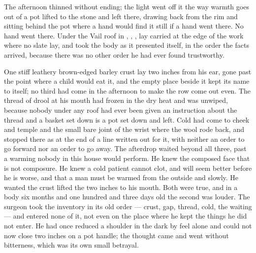 The afternoon thinned without ending; the light went off it the way warmth goes out of a pot lifted to the stone and left there, drawing back from the rim and sitting behind the pot where a hand would find it still if a hand went there. No hand went there. Under the Vail roof in , , ,  lay carried at the edge of the work where no slate lay, and took the body as it presented itself, in the order the facts arrived, because there was no other order he had ever found trustworthy.

One stiff leathery brown-edged barley crust lay two inches from his ear, gone past the point where a child would eat it, and the empty place beside it kept its name to itself; no third had come in the afternoon to make the row come out even. The thread of drool at his mouth had frozen in the dry heat and was unwiped, because nobody under any roof had ever been given an instruction about the thread and a basket set down is a pot set down and left. Cold had come to cheek and temple and the small bare joint of the wrist where the wool rode back, and stopped there as at the end of a line written out for it, with neither an order to go forward nor an order to go away. The afterdrop waited beyond all three, past a warming nobody in this house would perform. He knew the composed face that is not composure. He knew a cold patient cannot clot, and will seem better before he is worse, and that a man must be warmed from the outside and slowly. He wanted the crust lifted the two inches to his mouth. Both were true, and in a body six months and one hundred and three days old the second was louder. The surgeon took the inventory in its old order --- crust, gap, thread, cold, the waiting --- and entered none of it, not even on the place where he kept the things he did not enter. He had once reduced a shoulder in the dark by feel alone and could not now close two inches on a pot handle; the thought came and went without bitterness, which was its own small betrayal.

